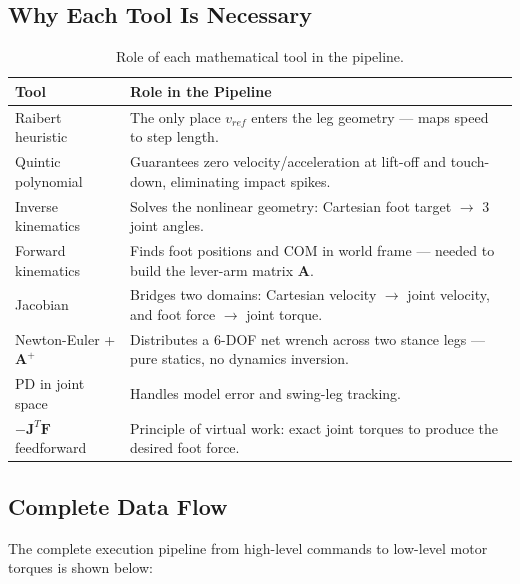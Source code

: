 \documentclass[11pt,a4paper]{article}
\begin{document}
\subsection{Why Each Tool Is Necessary}
\begin{table}[h!]
\centering
\begin{tabular}{lp{10cm}}
\toprule
\textbf{Tool} & \textbf{Role in the Pipeline} \\
\midrule
Raibert heuristic & The only place $v_{ref}$ enters the leg geometry — maps speed to step length. \\
Quintic polynomial & Guarantees zero velocity/acceleration at lift-off and touch-down, eliminating impact spikes. \\
Inverse kinematics & Solves the nonlinear geometry: Cartesian foot target $\to$ 3 joint angles. \\
Forward kinematics & Finds foot positions and COM in world frame — needed to build the lever-arm matrix $\mathbf{A}$. \\
Jacobian & Bridges two domains: Cartesian velocity $\to$ joint velocity, and foot force $\to$ joint torque. \\
Newton-Euler + $\mathbf{A}^+$ & Distributes a 6-DOF net wrench across two stance legs — pure statics, no dynamics inversion. \\
PD in joint space & Handles model error and swing-leg tracking. \\
$-\mathbf{J}^T \mathbf{F}$ feedforward & Principle of virtual work: exact joint torques to produce the desired foot force. \\
\bottomrule
\end{tabular}
\caption{Role of each mathematical tool in the pipeline.}
\end{table}

\subsection{Complete Data Flow}
The complete execution pipeline from high-level commands to low-level motor torques is shown below:
\end{document}
